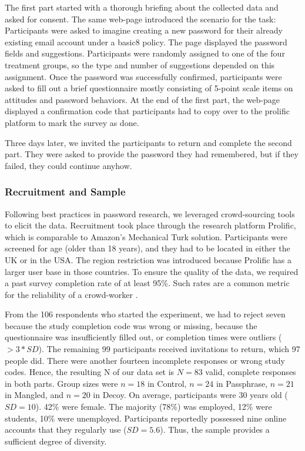 The first part started with a thorough briefing about the collected data and asked for consent. The same web-page introduced the scenario for the task: Participants were asked to imagine creating a new password for their already existing email account under a basic8 policy. The page displayed the password fields and suggestions. Participants were randomly assigned to one of the four treatment groups, so the type and number of suggestions depended on this assignment. Once the password was successfully confirmed, participants were asked to fill out a brief questionnaire mostly consisting of 5-point scale items on attitudes and password behaviors. At the end of the first part, the web-page displayed a confirmation code that participants had to copy over to the prolific platform to mark the survey as done. 

Three days later, we invited the participants to return and complete the second part. They were asked to provide the password they had remembered, but if they failed, they could continue anyhow. 

\subsubsection{Recruitment and Sample}
Following best practices in password research, we leveraged crowd-sourcing tools to elicit the data. Recruitment took place through the research platform Prolific, which is comparable to Amazon's Mechanical Turk solution. Participants were screened for age (older than 18 years), and they had to be located in either the UK or in the USA. The region restriction was introduced because Prolific has a larger user base in those countries. To ensure the quality of the data, we required a past survey completion rate of at least 95\%. Such rates are a common metric for the reliability of a crowd-worker \cite{Ross2010WhoAreTurkers}. 

From the 106 respondents who started the experiment, we had to reject seven because the study completion code was wrong or missing, because the questionnaire was insufficiently filled out, or completion times were outliers ($> 3*SD$). The remaining 99 participants received invitations to return, which 97 people did. There were another fourteen incomplete responses or wrong study codes. Hence, the resulting N of our data set is $N = 83$ valid, complete responses in both parts. Group sizes were $n=18$ in Control, $n=24$ in Passphrase, $n=21$ in Mangled, and $n=20$ in Decoy. On average, participants were 30 years old ($SD=10$). 42\% were female. The majority (78\%) was employed, 12\% were students, 10\% were unemployed. Participants reportedly possessed nine online accounts that they regularly use ($SD=5.6$). Thus, the sample provides a sufficient degree of diversity. 

